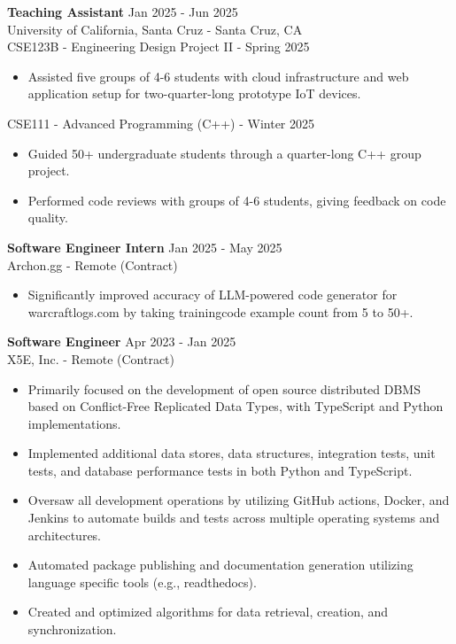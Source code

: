 \documentclass[a4paper,10pt]{article}
\begin{document}
\begin{flushleft}
  \textbf{Teaching Assistant} \hfill Jan 2025 - Jun 2025 \\
  University of California, Santa Cruz - Santa Cruz, CA \\
  CSE123B - Engineering Design Project II - Spring 2025
  \begin{itemize}
    \item Assisted five groups of 4-6 students with cloud infrastructure and web application setup for two-quarter-long prototype IoT devices.
  \end{itemize}
  CSE111 - Advanced Programming (C++) - Winter 2025
  \begin{itemize}
    \item Guided 50+ undergraduate students through a quarter-long C++ group project.
    \item Performed code reviews with groups of 4-6 students, giving feedback on code quality.
  \end{itemize}
\end{flushleft}

\begin{flushleft}
  \textbf{Software Engineer Intern} \hfill Jan 2025 - May 2025 \\
  Archon.gg - Remote (Contract)
  \begin{itemize}
    \item Significantly improved accuracy of LLM-powered code generator for warcraftlogs.com by taking trainingcode example count from 5 to 50+.
  \end{itemize}
\end{flushleft}

\begin{flushleft}
  \textbf{Software Engineer} \hfill Apr 2023 - Jan 2025 \\
  X5E, Inc. - Remote (Contract)
  \begin{itemize}
    \item Primarily focused on the development of open source distributed DBMS based on Conflict-Free Replicated Data Types, with TypeScript and Python implementations.
    \item Implemented additional data stores, data structures, integration tests, unit tests, and database performance tests in both Python and TypeScript.
    \item Oversaw all development operations by utilizing GitHub actions, Docker, and Jenkins to automate builds and tests across multiple operating systems and architectures.
    \item Automated package publishing and documentation generation utilizing language specific tools (e.g., readthedocs).
    \item Created and optimized algorithms for data retrieval, creation, and synchronization.
  \end{itemize}
\end{flushleft}
\end{document}
